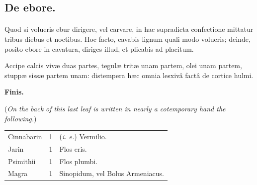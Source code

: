 \documentclass[a4paper, 11pt, oneside, polutonikogreek, italian]{article}
\begin{document}
\subsection{De ebore.}
\paragraph{}
Quod si volueris ebur dirigere, vel carvare, in hac supradicta confectione mittatur tribus diebus et noctibus. Hoc facto, cavabis lignum quali modo volueris; deinde, posito ebore in cavatura, diriges illud, et plicabis ad placitum.

Accipe calcis vivæ duas partes, tegulæ tritæ unam partem, olei unam partem, stuppæ sissæ partem unam: distempera hæc omnia lesxivâ factâ de cortice hulmi.
\begin{center}
\textbf{Finis.}
\end{center}
\begin{center}
(\emph{On the back of this last leaf is written in nearly a cotemporary hand the following.})
\end{center}
\begin{table}[H]
    \centering\bfseries\small
    \begin{tabular}{l l l}
        Cinnabarin  & 1 &  (\emph{i. e.}) Vermilio.                 \\
         Jarin       & 1 &  Flos eris.                        \\
         Psimithii   & 1 &  Flos plumbi.                      \\
         Magra       & 1 &  Sinopidum, vel Bolus Armeniacus. \\
    \end{tabular}
\end{table}
\end{document}
